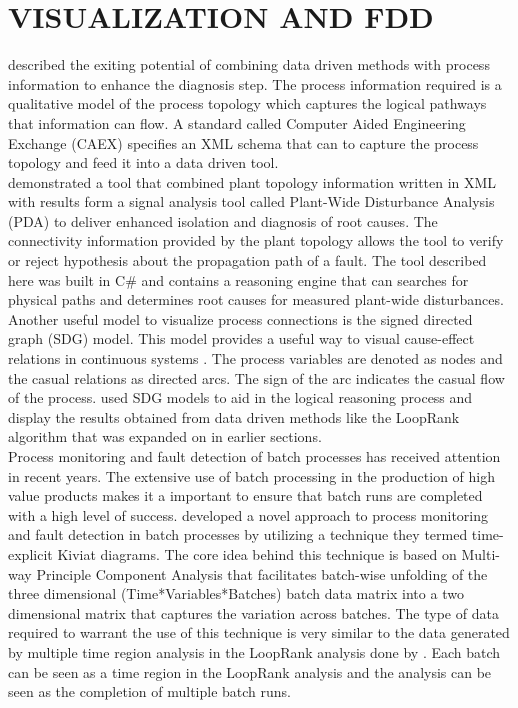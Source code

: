 \section{VISUALIZATION AND FDD}

\cite{thornhill2007advances} described the exiting potential of combining data driven methods with process information to enhance the diagnosis step. The process information required is a qualitative model of the process topology which captures the logical pathways that information can flow. A standard called Computer Aided Engineering Exchange (CAEX) specifies an XML schema that can to capture the process topology and feed it into a data driven tool.\\

\cite{yim2006using} demonstrated a tool that combined plant topology information written in XML with results form a signal analysis tool called Plant-Wide Disturbance Analysis (PDA) to deliver enhanced isolation and diagnosis of root causes. The connectivity information provided by the plant topology allows the tool to verify or reject hypothesis about the propagation path of a fault. The tool described here was built in C\# and contains a reasoning engine that can searches for physical paths and determines root causes for measured plant-wide disturbances.\\

Another useful model to visualize process connections is the signed directed graph (SDG) model. This model provides a useful way to visual cause-effect relations in continuous systems \cite{yang2010qualitative}. The process variables are denoted as nodes and the casual relations as directed arcs. The sign of the arc indicates the casual flow of the process. \cite{streicher2019plant} used SDG models to aid in the logical reasoning process and display the results obtained from data driven methods like the LoopRank algorithm that was expanded on in earlier sections.\\

Process monitoring and fault detection of batch processes has received attention in recent years. The extensive use of batch processing in the production of high value products makes it a important to ensure that batch runs are completed with a high level of success. \cite{wang2018geometric} developed a novel approach to process monitoring and fault detection in batch processes by utilizing a technique they termed time-explicit Kiviat diagrams. The core idea behind this technique is based on Multi-way Principle Component Analysis that facilitates batch-wise unfolding of the three dimensional (Time*Variables*Batches) batch data matrix into a two dimensional matrix that captures the variation across batches. The type of data required to warrant the use of this technique is very similar to the data generated by multiple time region analysis in the LoopRank analysis done by \cite{streicher2019plant}. Each batch can be seen as a time region in the LoopRank analysis and the analysis can be seen as the completion of multiple batch runs.

